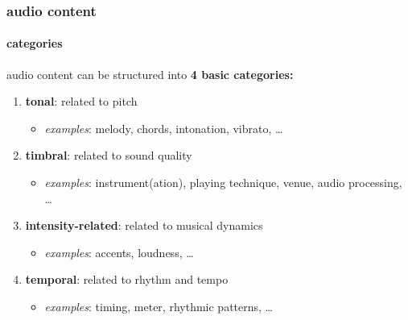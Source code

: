         \begin{frame}\frametitle{audio content}\framesubtitle{categories}
            audio content can be structured into \textbf{4 basic categories:}
            
            \bigskip
            \begin{enumerate}
                \item<2->	\textbf{tonal}: related to pitch
                    \begin{itemize}
                        \item   \textit{examples}: melody, chords, intonation, vibrato, \ldots
                    \end{itemize}
                        \smallskip
                \item<3->	\textbf{timbral}: related to sound quality
                    \begin{itemize}
                        \item   \textit{examples}: instrument(ation), playing technique, venue, audio processing, \ldots
                    \end{itemize}
                        \smallskip
                \item<4->	\textbf{intensity-related}: related to musical dynamics
                    \begin{itemize}
                        \item   \textit{examples}: accents, loudness, \ldots
                    \end{itemize}
                        \smallskip
                \item<5->	\textbf{temporal}: related to rhythm and tempo
                    \begin{itemize}
                        \item   \textit{examples}: timing, meter, rhythmic patterns, \ldots
                    \end{itemize}
                        \smallskip
            \end{enumerate}
        \end{frame}


